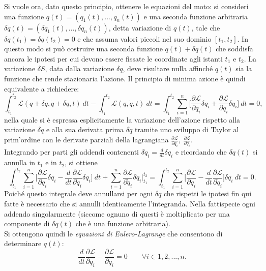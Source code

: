 Si vuole ora, dato questo principio, ottenere le equazioni del moto: si consideri una funzione $q(t)=(q_1(t),...,q_n(t))$ e una seconda funzione arbitraria $\delta q(t)=(\delta q_1(t),...,\delta q_n(t))$, detta variazione di $q(t)$, tale che $\delta q (t_1)=\delta q(t_2)=0$ e che assuma valori piccoli nel suo dominio $[t_1,t_2]$. In questo modo si può costruire una seconda funzione $q(t)+\delta q(t)$ che soddisfa ancora le ipotesi per cui devono essere fissate le coordinate agli istanti $t_1$ e $ t_2$. 
La variazione $\delta S$, data dalla variazione $\delta q$, deve risultare nulla affinché $q(t)$ sia la funzione che rende stazionaria l'azione. Il principio di minima azione è quindi equivalente a richiedere:
\begin{equation}
    \int_{t_1}^{t_2} \mathcal{L}(q+\delta q,\dot{q}+\delta \dot{q},t)\ dt-\int_{t_1}^{t_2} \mathcal{L}(q,\dot{q},t)\ dt=\int_{t_1}^{t_2}\sum_{i=1}^{n}\bigg[\frac{\partial\mathcal{L} }{\partial q_i}\delta q_i+\frac{\partial\mathcal{L} }{\partial \dot{q}_i}\delta \dot{q}_i \bigg]\ dt=0,
\end{equation}
nella quale si è espressa esplicitamente la variazione dell'azione rispetto alla variazione $\delta q$ e alla sua derivata prima $\delta \dot{q}$ tramite uno sviluppo di Taylor al prim'ordine con le derivate parziali della lagrangiana $\frac{\partial\mathcal{L} }{\partial q_i},\ \frac{\partial\mathcal{L} }{\partial \dot{q}_i}$.\\
Integrando per parti gli addendi contenenti $\delta \dot{q}_i=\frac{d}{dt}\delta q_i$ e ricordando che $\delta q (t)$ si annulla in $t_1$ e in $t_2$, si ottiene
\begin{equation*}
    \int_{t_1}^{t_2}\sum_{i=1}^{n}\bigg[\frac{\partial\mathcal{L} }{\partial q_i}\delta q_i-\frac{d}{dt}\frac{\partial\mathcal{L} }{\partial \dot{q}_i}\delta q_i \bigg]\ dt+\sum_{i=1}^n\frac{\partial\mathcal{L} }{\partial \dot q_i}\delta \dot{q}_i\bigg|_{t_1}^{t_2}=\int_{t_1}^{t_2}\sum_{i=1}^{n}\bigg[\frac{\partial\mathcal{L} }{\partial q_i}-\frac{d}{dt}\frac{\partial\mathcal{L} }{\partial \dot{q}_i} \bigg]\delta q_i\ dt=0.
\end{equation*}
Poiché questo integrale deve annullarsi per ogni $\delta q$ che rispetti le ipotesi fin qui fatte è necessario che si annulli identicamente l'integranda. Nella fattispecie ogni addendo singolarmente (siccome ognuno di questi è moltiplicato per una componente di $\delta q(t)$ che è una funzione arbitraria).\\Si ottengono quindi le \emph{equazioni di Eulero-Lagrange} che consentono di determinare $q(t)$:
\begin{equation}
    \label{eulero-lagrange}
    \frac{d}{dt}\frac{\partial\mathcal{L} }{\partial \dot{q}_i}-\frac{\partial\mathcal{L} }{\partial q_i}=0 \qquad \forall i\in{1,2,...,n}.
\end{equation}

